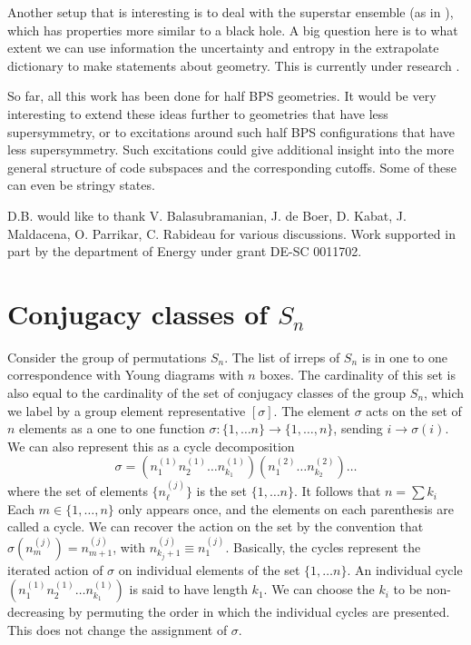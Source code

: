 \documentclass[12pt,nofootinbib, longbibliography]{revtex4-1}
\begin{document}
Another setup that is interesting is to deal with the superstar ensemble (as in \cite{Balasubramanian:2005mg}), which has properties more similar to a black hole. A big question here is to what extent we can use information the uncertainty and entropy in the extrapolate dictionary to make statements about geometry.
This is currently under research \cite{Weall}.

So far, all this work has been done for half BPS geometries. It would be very interesting to extend these ideas further to geometries that have less supersymmetry, or to excitations around such half BPS configurations that have less supersymmetry.  Such excitations could give additional insight into the more general structure of code subspaces and the corresponding cutoffs. Some of these can even be stringy states.

\acknowledgments

D.B. would like to thank V. Balasubramanian, J. de Boer, D. Kabat,  J. Maldacena, O. Parrikar, C. Rabideau for various discussions. 
Work  supported in part by the department of Energy under grant {DE-SC} 0011702. 




\appendix

\section{Conjugacy classes of $S_n$ }\label{sec:appa}

 Consider the group of permutations $S_n$. The list of irreps of $S_n$ is in one to one correspondence with Young diagrams with $n$ boxes.
The cardinality of this set is also equal to the cardinality of the set of conjugacy classes of the group $S_n$, which we label by a group element representative $[\sigma]$.
The element $\sigma$ acts on the set of $n$ elements as a one to one function $\sigma: \{1, \dots n\}\to \{1, \dots, n\}$, sending $i \to \sigma(i)$. We can also represent this as a cycle decomposition
\begin{equation}
\sigma= (n^{(1)}_1 n^{(1)}_2\dots n^{(1)}_{k_1})(n^{(2)}_1\dots n^{(2)}_{k_2}) \dots
\end{equation} 
where the set of elements   $\{n^{(j)}_\ell \}$ is the set $\{1, \dots n\}$. It follows that $n= \sum k_i$
 Each $m\in \{1,\dots, n\}$ only appears once, and the elements on each parenthesis are called a cycle. 
We can recover the action on the set by the convention that $\sigma(n^{(j)}_{m})= n^{(j)}_{m+1}$, with $n^{(j)}_{k_j+1}\equiv n^{(j)}_{1}$. Basically, the cycles represent the iterated action of $\sigma$ on individual elements of the set $\{1, \dots n\}$. An individual cycle $ (n^{(1)}_1 n^{(1)}_2\dots n^{(1)}_{k_1})$ is said to have length $k_1$. We can choose the $k_i$ to be non-decreasing by permuting the order in which the individual cycles are presented. This does not change the assignment of $\sigma$. 




{}
\end{document}
